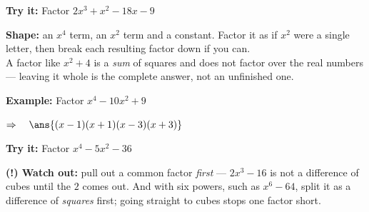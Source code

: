 \documentclass[12pt]{article}
\begin{document}
\begin{tryitbox}
\textbf{Try it:} \quad Factor $2x^{3} + x^{2} - 18x - 9$\\[2pt]
\end{tryitbox}


\begin{formulabox}
\textbf{Shape:} an $x^{4}$ term, an $x^{2}$ term and a constant. Factor it as if
$x^{2}$ were a single letter, then break each resulting factor down if you
can.\\[3pt]
A factor like $x^{2} + 4$ is a \textit{sum} of squares and does not factor over
the real numbers --- leaving it whole is the complete answer, not an unfinished
one.
\end{formulabox}

\begin{examplebox}
\textbf{Example:} \quad Factor $x^{4} - 10x^{2} + 9$

$\Rightarrow\quad \ans{(x-1)(x+1)(x-3)(x+3)}$
\end{examplebox}

\begin{tryitbox}
\textbf{Try it:} \quad Factor $x^{4} - 5x^{2} - 36$\\[2pt]
\end{tryitbox}

\begin{watchoutbox}
\textbf{(!) Watch out:} pull out a common factor \textit{first} --- $2x^{3} - 16$
is not a difference of cubes until the $2$ comes out. And with six powers, such
as $x^{6} - 64$, split it as a difference of \textit{squares} first; going
straight to cubes stops one factor short.
\end{watchoutbox}
\end{document}
